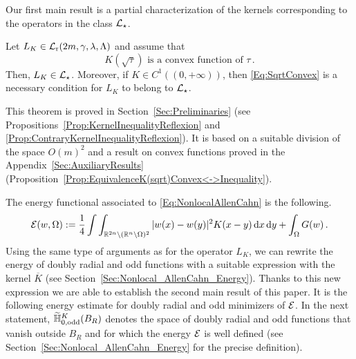 Our first main result is a partial characterization of the kernels corresponding to the operators in the class $\mathcal{L}_\star$.

\begin{theorem}
	\label{Th:CharacterizationLstar}
	Let $L_K \in \mathcal{L}_{\mathrm{r}}(2m,\gamma,\lambda, \Lambda)$ and assume that 
	\begin{equation}
		\label{Eq:SqrtConvex}	
		K(\sqrt{\tau}) \text{ is a convex function of }\tau\,.
	\end{equation}
	Then, $L_K\in \mathcal{L}_\star$. Moreover, if $K\in C^1((0,+\infty))$, then \eqref{Eq:SqrtConvex} is a necessary condition for $L_K$ to belong to $\mathcal{L}_\star$.
\end{theorem}

This theorem is proved in Section~\ref{Sec:Preliminaries} (see Propositions~\ref{Prop:KernelInequalityReflexion} and \ref{Prop:ContraryKernelInequalityReflexion}). It is based on a suitable division of the space $O(m)^2$ and a result on convex functions proved in the Appendix~\ref{Sec:AuxiliaryResults} (Proposition~\ref{Prop:EquivalenceK(sqrt)Convex<->Inequality}).




The energy functional associated to \eqref{Eq:NonlocalAllenCahn} is the following.
\begin{equation}
\label{Eq:Energy}
\mathcal{E}(w, \Omega) := \dfrac{1}{4}\int\int_{\mathbb{R}^{2n} \setminus (\mathbb{R}^n\setminus\Omega)^2} |w(x) - w(y)|^2 K(x-y) \,\mathrm{d} x \,\mathrm{d} y + \int_{\Omega} G(w)\,.
\end{equation}
Using the same type of arguments as for the operator $L_K$, we can rewrite the energy of doubly radial and odd functions with a suitable expression with the kernel $\overline{K}$ (see Section~\ref{Sec:Nonlocal_AllenCahn_Energy}). Thanks to this new expression we are able to establish the second main result of this paper. It is the following energy estimate for doubly radial and odd minimizers of $\mathcal{E}$. In the next statement, $\widetilde{\mathbb{H}}^K_{0, \mathrm{odd}}(B_R)$ denotes the space of doubly radial and odd functions that vanish outside $B_R$ and for which the energy $\mathcal{E}$ is well defined (see Section~\ref{Sec:Nonlocal_AllenCahn_Energy} for the precise definition).


